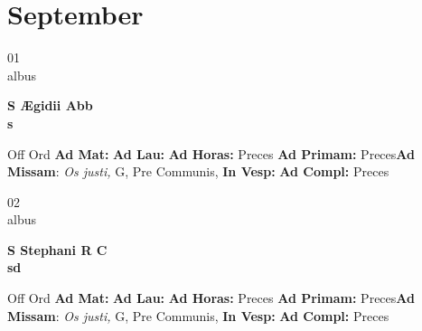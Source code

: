 \documentclass[10pt, openany]{book}
\begin{document}
    \chapter{September}
                    
    \begin{center}
        \begin{minipage}{3.5in}
            \vspace{2em}
            \begin{minipage}{0.5in}
                {\Huge 01} \\
                {\normalsize albus}
            \end{minipage}
            \begin{minipage}{3.0in}
                \textbf{ \large S Ægidii Abb \\
                \textnormal{\normalsize s}}

            \end{minipage}
            \begin{justify}Off Ord
                \textbf{Ad Mat: }
                \textbf{Ad Lau: }
                \textbf{Ad Horas: }Preces
                \textbf{Ad Primam: }Preces\textbf{Ad Missam}: \textit{Os justi,} G, Pre Communis, 
                \textbf{In Vesp: }
                \textbf{Ad Compl: }Preces
            \end{justify}
        \end{minipage}
    \end{center}

    \begin{center}
        \begin{minipage}{3.5in}
            \vspace{2em}
            \begin{minipage}{0.5in}
                {\Huge 02} \\
                {\normalsize albus}
            \end{minipage}
            \begin{minipage}{3.0in}
                \textbf{ \large S Stephani R C \\
                \textnormal{\normalsize sd}}

            \end{minipage}
            \begin{justify}Off Ord
                \textbf{Ad Mat: }
                \textbf{Ad Lau: }
                \textbf{Ad Horas: }Preces
                \textbf{Ad Primam: }Preces\textbf{Ad Missam}: \textit{Os justi,} G, Pre Communis, 
                \textbf{In Vesp: }
                \textbf{Ad Compl: }Preces
            \end{justify}
        \end{minipage}
    \end{center}
\end{document}
